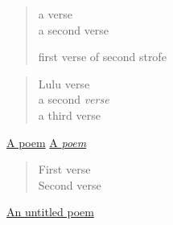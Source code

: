 \label{poem:1}
\begin{verse}
a verse \\
a second verse

first verse of second strofe

\end{verse}
\label{poem:2}
\begin{verse}
Lulu verse \\
a second \emph{verse} \\
a third verse

\end{verse}
\hyperref[poem:1]{A poem}
\hyperref[poem:2]{A \emph{poem}}
\hypertarget{label3}{}\begin{verse}
First verse \\
Second verse

\end{verse}
\hyperlink{label3}{An untitled poem}

